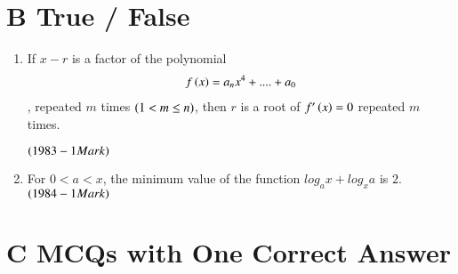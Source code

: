 \documentclass[journal,12pt,twocolumn]{IEEEtran}
\theoremstyle{remark}
\begin{document}
\section{B True / False}

\begin{enumerate}

\item If $x-r$ is a factor of the polynomial
\begin{align*}
	f\left(x\right) = a_{n}x^{4}+....+a_{0}
\end{align*},
repeated $m$ times $\left(1< m\leq n\right)$, then $r$ is a root of 
$f'\left(x\right)=0$ repeated $m$ times.

\hfill$\left(1983 - 1 Mark\right)$

\item For $0 < a < x$, the minimum value of the function 
$log_a x + log_x a$ is $2$. 
\hfill$\left(1984 - 1 Mark\right)$\\

\end{enumerate}

\section{C MCQs with One Correct Answer}
\end{document}
